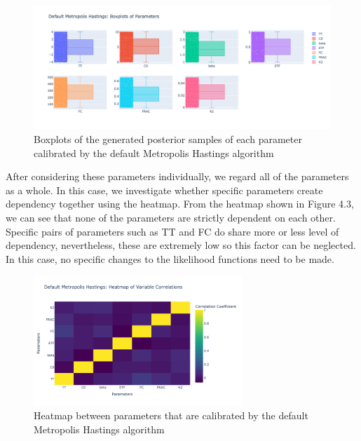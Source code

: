 \begin{figure}[H]
    \centering
    \includegraphics[width=1\textwidth]{figures/basic_mh/default_mh/default_mh_boxplot.png}
    \captionsetup{width=.8\textwidth}
    \caption{Boxplots of the generated posterior samples of each parameter calibrated by the default Metropolis Hastings algorithm}
    \label{fig:enter-label}
\end{figure}



After considering these parameters individually, we regard all of the parameters as a whole. In this case, we investigate whether specific parameters create dependency together using the heatmap. From the heatmap shown in Figure 4.3, we can see that none of the parameters are strictly dependent on each other. Specific pairs of parameters such as TT and FC do share more or less level of dependency, nevertheless, these are extremely low so this factor can be neglected. In this case, no specific changes to the likelihood functions need to be made.


\begin{figure}[H]
    \centering
    \includegraphics[width=0.7\textwidth]{figures/basic_mh/default_mh/default_mh_heatmap.png}
    \captionsetup{width=.8\textwidth}
    \caption{Heatmap between parameters that are calibrated by the default Metropolis Hastings algorithm}
    \label{fig:enter-label}
\end{figure}


